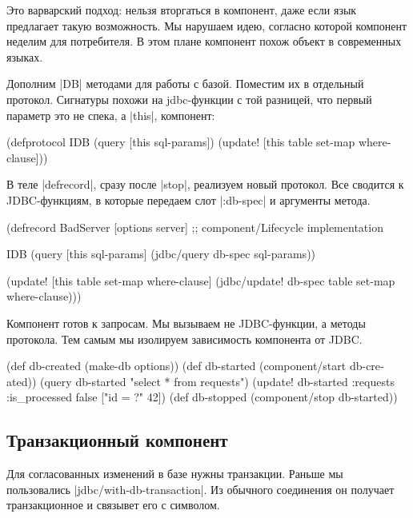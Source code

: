 Это варварский подход: нельзя вторгаться в компонент, даже если язык предлагает
такую возможность. Мы нарушаем идею, согласно которой компонент неделим для
потребителя. В этом плане компонент похож объект в современных языках.

Дополним \spverb|DB| методами для работы с базой. Поместим их в отдельный
протокол. Сигнатуры похожи на jdbc-функции с той разницей, что первый параметр
это не спека, а \spverb|this|, компонент:

\begin{english}
  \begin{clojure}
(defprotocol IDB
  (query [this sql-params])
  (update! [this table set-map where-clause]))
  \end{clojure}
\end{english}

В теле \spverb|defrecord|, сразу после \spverb|stop|, реализуем новый
протокол. Все сводится к JDBC-функциям, в которые передаем слот
\spverb|:db-spec| и аргументы метода.

\begin{english}
  \begin{clojure}
(defrecord BadServer [options server]
  ;; component/Lifecycle implementation

  IDB
  (query [this sql-params]
    (jdbc/query db-spec sql-params))

  (update! [this table set-map where-clause]
    (jdbc/update! db-spec table set-map where-clause)))
  \end{clojure}
\end{english}

Компонент готов к запросам. Мы вызываем не JDBC-функции, а методы протокола. Тем
самым мы изолируем зависимость компонента от JDBC.

\begin{english}
  \begin{clojure}
(def db-created (make-db options))
(def db-started (component/start db-created))
(query db-started "select * from requests")
(update! db-started :requests {:is_processed false} ["id = ?" 42])
(def db-stopped (component/stop db-started))
  \end{clojure}
\end{english}

\subsection{Транзакционный компонент}

Для согласованных изменений в базе нужны транзакции. Раньше мы пользовались
\spverb|jdbc/with-db-transaction|. Из обычного соединения он получает
транзакционное и связывет его с символом.

